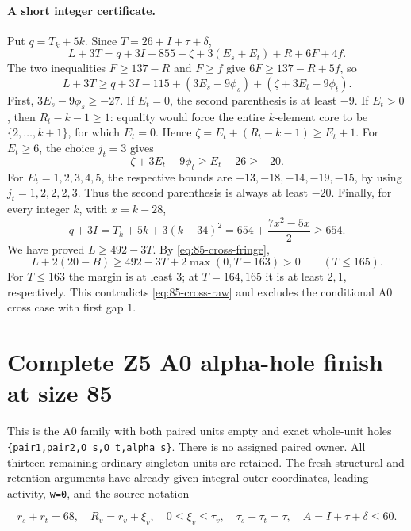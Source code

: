 \documentclass[10pt,a4paper]{article}
\theoremstyle{definition}
\begin{document}
\paragraph{A short integer certificate.}
Put $q=T_k+5k$. Since $T=26+I+\tau+\delta$,
\[
 L+3T=q+3I-855+\zeta+3(E_s+E_t)+R+6F+4f.
\]
The two inequalities $F\ge137-R$ and $F\ge f$ give
$6F\ge137-R+5f$, so
\[
 L+3T\ge q+3I-115
 +(3E_s-9\phi_s)+(\zeta+3E_t-9\phi_t).
\]
First, $3E_s-9\phi_s\ge-27$.
If $E_t=0$, the second parenthesis is at least $-9$.
If $E_t>0$, then $R_t-k-1\ge1$: equality would force the entire
$k$-element core to be $\{2,\ldots,k+1\}$, for which $E_t=0$.
Hence $\zeta=E_t+(R_t-k-1)\ge E_t+1$.
For $E_t\ge6$, the choice $j_t=3$ gives
\[
 \zeta+3E_t-9\phi_t\ge E_t-26\ge-20.
\]
For $E_t=1,2,3,4,5$, the respective bounds are
$-13,-18,-14,-19,-15$, by using $j_t=1,2,2,2,3$.
Thus the second parenthesis is always at least $-20$.
Finally, for every integer $k$, with $x=k-28$,
\[
 q+3I=T_k+5k+3(k-34)^2
 =654+\frac{7x^2-5x}{2}\ge654.
\]
We have proved $L\ge492-3T$. By \eqref{eq:85-cross-fringe},
\[
 L+2(20-B)\ge492-3T+2\max(0,T-163)>0
 \qquad(T\le165).
\]
For $T\le163$ the margin is at least $3$; at $T=164,165$ it is at
least $2,1$, respectively. This contradicts \eqref{eq:85-cross-raw}
and excludes the conditional A0 cross case with first gap $1$.

\clearpage
\hypertarget{complete-z5-a0-alpha-hole-finish-at-size-85}{%
\section{Complete Z5 A0 alpha-hole finish at size
85}\label{complete-z5-a0-alpha-hole-finish-at-size-85}}

This is the A0 family with both paired units empty and exact whole-unit
holes \texttt{\{pair1,\allowbreak{}pair2,\allowbreak{}O\_\allowbreak{}\allowbreak{}s,\allowbreak{}O\_\allowbreak{}\allowbreak{}t,\allowbreak{}alpha\_\allowbreak{}\allowbreak{}s\}}.
There is no assigned paired owner. All thirteen remaining ordinary
singleton units are retained. The fresh structural and retention
arguments have already given integral outer coordinates,\allowbreak{} leading
activity,\allowbreak{} \texttt{w=\allowbreak{}0},\allowbreak{} and the source notation

\[
 r_s+\allowbreak{}r_t=\allowbreak{}68,\allowbreak{}\quad R_v=\allowbreak{}r_v+\allowbreak{}\xi_v,\allowbreak{}\quad
 0\le\xi_v\le\tau_v,\allowbreak{}\quad \tau_s+\allowbreak{}\tau_t=\allowbreak{}\tau,\allowbreak{}
 \quad A=\allowbreak{}I+\allowbreak{}\tau+\allowbreak{}\delta\le60.
\]
\end{document}
